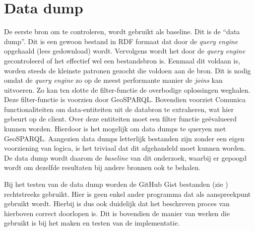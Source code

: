 \section{Data dump}
\label{sec:data-dump}
De eerste bron om te controleren, wordt gebruikt als baseline. Dit is de ``data dump''. Dit is een gewoon bestand in RDF formaat dat door de \textit{query engine} opgehaald (lees gedownload) wordt. Vervolgens wordt het door de \textit{query engine} gecontroleerd of het effectief wel een bestandsbron is. Eenmaal dit voldaan is, worden steeds de kleinste patronen gezocht die voldoen aan de bron. Dit is nodig omdat de \textit{query engine} zo op de meest performante manier de \textit{joins} kan uitvoeren. Zo kan ten slotte de filter-functie de overbodige oplossingen weghalen. Deze filter-functie is voorzien door GeoSPARQL. Bovendien voorziet Comunica functionaliteiten om data-entiteiten uit de databron te extraheren, wat hier gebeurt op de client. Over deze entiteiten moet een filter functie geëvalueerd kunnen worden. Hierdoor is het mogelijk om data dumps te queryen met GeoSPARQL. Aangezien data dumps letterlijk bestanden zijn zonder een eigen voorziening van logica, is het triviaal dat dit afgehandeld moet kunnen worden. De data dump wordt daarom de \textit{baseline} van dit onderzoek, waarbij er gepoogd wordt om dezelfde resultaten bij andere bronnen ook te behalen.

Bij het testen van de data dump worden de GitHub Gist bestanden (zie ) rechtstreeks gebruikt. Hier is geen enkel ander programma dat als aanspreekpunt gebruikt wordt. Hierbij is dus ook duidelijk dat het beschreven proces van hierboven correct doorlopen is. Dit is bovendien de manier van werken die gebruikt is bij het maken en testen van de implementatie.